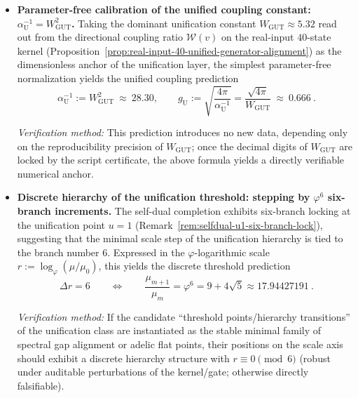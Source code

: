 \begin{itemize}
  \item \textbf{Parameter-free calibration of the unified coupling constant: \(\alpha_{\mathrm{U}}^{-1}=W_{\mathrm{GUT}}^2\).}
  Taking the dominant unification constant \(W_{\mathrm{GUT}}\approx 5.32\) read out from the directional coupling ratio \(\mathcal{W}(v)\) on the real-input \(40\)-state kernel (Proposition~\ref{prop:real-input-40-unified-generator-alignment}) as the dimensionless anchor of the unification layer, the simplest parameter-free normalization yields the unified coupling prediction
  \[
  \boxed{\ \alpha_{\mathrm{U}}^{-1}:=W_{\mathrm{GUT}}^2\ \approx\ 28.30,\qquad
  g_{\mathrm{U}}:=\sqrt{\frac{4\pi}{\alpha_{\mathrm{U}}^{-1}}}=\frac{\sqrt{4\pi}}{W_{\mathrm{GUT}}}\ \approx\ 0.666\ }.
  \]
  \par\noindent\emph{Verification method:} This prediction introduces no new data, depending only on the reproducibility precision of \(W_{\mathrm{GUT}}\); once the decimal digits of \(W_{\mathrm{GUT}}\) are locked by the script certificate, the above formula yields a directly verifiable numerical anchor.

  \item \textbf{Discrete hierarchy of the unification threshold: stepping by \(\varphi^6\) six-branch increments.}
  The self-dual completion exhibits six-branch locking at the unification point \(u=1\) (Remark~\ref{rem:selfdual-u1-six-branch-lock}), suggesting that the minimal scale step of the unification hierarchy is tied to the branch number \(6\). Expressed in the \(\varphi\)-logarithmic scale \(r:=\log_{\varphi}(\mu/\mu_0)\), this yields the discrete threshold prediction
  \[
  \boxed{\ \Delta r=6\qquad\Longleftrightarrow\qquad \frac{\mu_{m+1}}{\mu_m}=\varphi^6=9+4\sqrt5\approx 17.94427191\ }.
  \]
  \par\noindent\emph{Verification method:} If the candidate ``threshold points/hierarchy transitions'' of the unification class are instantiated as the stable minimal family of spectral gap alignment or adelic flat points, their positions on the scale axis should exhibit a discrete hierarchy structure with \(r\equiv 0\pmod 6\) (robust under auditable perturbations of the kernel/gate; otherwise directly falsifiable).


\end{itemize}
